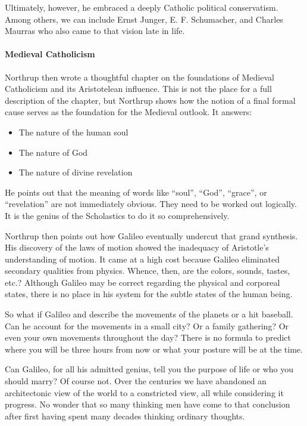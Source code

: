 Ultimately, however, he embraced a deeply Catholic political conservatism. Among others, we can include Ernst Junger, E. F. Schumacher, and Charles Maurras who also came to that vision late in life.

\paragraph{Medieval Catholicism}


Northrup then wrote a thoughtful chapter on the foundations of Medieval Catholicism and its Aristotelean influence. This is not the place for a full description of the chapter, but Northrup shows how the notion of a final formal cause serves as the foundation for the Medieval outlook. It answers:

\begin{itemize}
\item The nature of the human soul
\item The nature of God
\item The nature of divine revelation
\end{itemize}


He points out that the meaning of words like ``soul'', ``God'', ``grace'', or ``revelation'' are not immediately obvious. They need to be worked out logically. It is the genius of the Scholastics to do it so comprehensively.

Northrup then points out how Galileo eventually undercut that grand synthesis. His discovery of the laws of motion showed the inadequacy of Aristotle's understanding of motion. It came at a high cost because Galileo eliminated secondary qualities from physics. Whence, then, are the colors, sounds, tastes, etc.? Although Galileo may be correct regarding the physical and corporeal states, there is no place in his system for the subtle states of the human being.

So what if Galileo and describe the movements of the planets or a hit baseball. Can he account for the movements in a small city? Or a family gathering? Or even your own movements throughout the day? There is no formula to predict where you will be three hours from now or what your posture will be at the time.

Can Galileo, for all his admitted genius, tell you the purpose of life or who you should marry? Of course not. Over the centuries we have abandoned an architectonic view of the world to a constricted view, all while considering it progress. No wonder that so many thinking men have come to that conclusion after first having spent many decades thinking ordinary thoughts.

